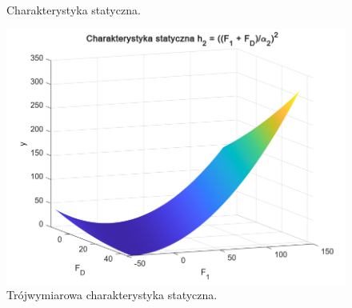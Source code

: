 \begin{figure}[h!]
\centering
{}
\quad
{}
\caption{Charakterystyka statyczna.}
\end{figure}

\newpage

\begin{figure}[h!]
\centering
\includegraphics[width=\textwidth]{pictures/static_characteristic_3D}
\caption{Trójwymiarowa charakterystyka statyczna.}
\end{figure}

